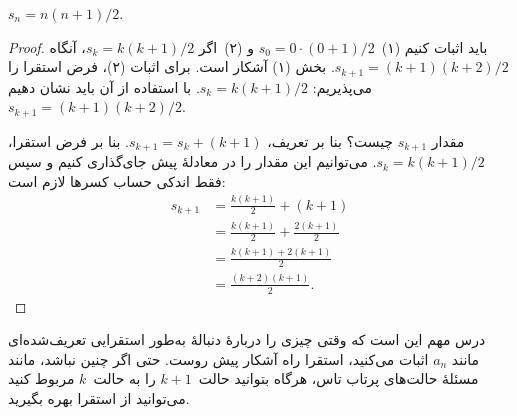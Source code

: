 \documentclass[../../../include/open-logic-section]{subfiles}
\begin{document}
\begin{prop}
  $s_n = n(n+1)/2$.
\end{prop}

\begin{proof}
  باید اثبات کنیم (۱)~$s_0 = 0\cdot(0 + 1)/2$ و (۲)~اگر
  $s_k = k(k+1)/2$، آنگاه $s_{k+1} = (k+1)(k+2)/2$. بخش (۱) آشکار
  است. برای اثبات (۲)، فرض استقرا را می‌پذیریم:
  $s_k = k(k+1)/2$. با استفاده از آن باید نشان دهیم
  $s_{k+1} = (k+1)(k+2)/2$.

  مقدار $s_{k+1}$ چیست؟ بنا بر تعریف، $s_{k+1} = s_k + (k+1)$. بنا بر
  فرض استقرا، $s_k = k(k+1)/2$. می‌توانیم این مقدار را در معادلهٔ پیش
  جای‌گذاری کنیم و سپس فقط اندکی حساب کسرها لازم است:
  \begin{align*}
    s_{k+1} & = \frac{k(k+1)}{2} + (k+1) \\
    & = \frac{k(k+1)}{2} + \frac{2(k+1)}{2} \\
    & = \frac{k(k+1) + 2(k+1)}{2} \\
    & = \frac{(k+2)(k+1)}{2}.
  \end{align*}
\end{proof}

درس مهم این است که وقتی چیزی را دربارهٔ دنبالهٔ به‌طور استقرایی
تعریف‌شده‌ای مانند $a_n$ اثبات می‌کنید، استقرا راه آشکار پیش روست.
حتی اگر چنین نباشد، مانند مسئلهٔ حالت‌های پرتاب تاس، هرگاه بتوانید
حالت~$k+1$ را به حالت~$k$ مربوط کنید می‌توانید از استقرا بهره بگیرید.
\end{document}
